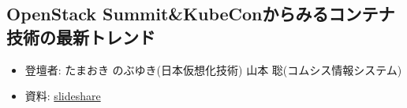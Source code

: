 \begin{center}
  \section*{OpenStack Summit\&KubeConからみるコンテナ技術の最新トレンド}
\end{center}


\begin{flushright}
  \begin{itemize}
  \item   登壇者: たまおき のぶゆき(日本仮想化技術) 山本 聡(コムシス情報システム)
  \item 資料: \href{https://www.slideshare.net/VirtualTech-JP/openstack-summit-kubecon-openstack-day-tokyo-2018}{slideshare}
  \end{itemize}
\end{flushright}
